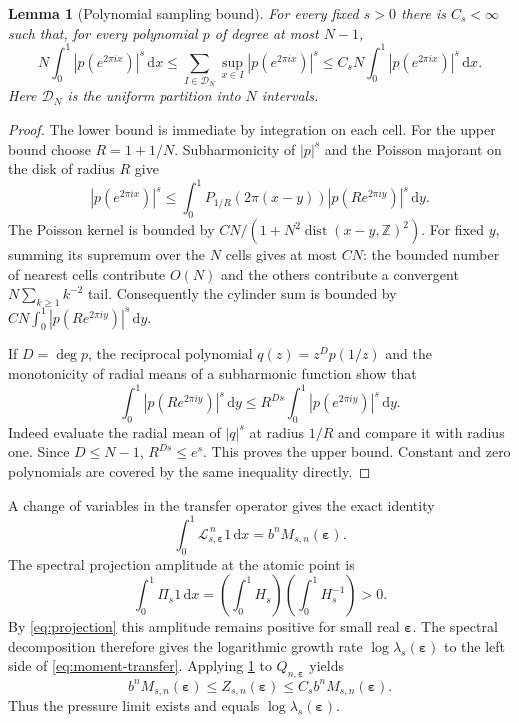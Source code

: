 \documentclass[11pt,a4paper]{article}
\numberwithin{equation}{section}
\newtheorem{lemma}[lemma]{Lemma}
\theoremstyle{definition}
\theoremstyle{remark}
\newcommand{\dd}{\,\mathrm d}
\newcommand{\Lop}{\mathcal L}
\newcommand{\dist}{\operatorname{dist}}
\newcommand{\eps}{\boldsymbol\varepsilon}
\newcommand{\Proj}{\Pi}
\begin{document}
\begin{lemma}[Polynomial sampling bound]
\label{lem:sampling}
For every fixed $s>0$ there is $C_s<\infty$ such that, for every
polynomial $p$ of degree at most $N-1$,
\begin{equation}
 N\int_0^1|p(e^{2\pi i x})|^s\dd x
 \leq\sum_{I\in\mathcal D_N}\sup_{x\in I}|p(e^{2\pi i x})|^s
 \leq C_s N\int_0^1|p(e^{2\pi i x})|^s\dd x.
 \label{eq:sampling}
\end{equation}
Here $\mathcal D_N$ is the uniform partition into $N$ intervals.
\end{lemma}
\begin{proof}
The lower bound is immediate by integration on each cell. For the
upper bound choose $R=1+1/N$. Subharmonicity of $|p|^s$ and the Poisson
majorant on the disk of radius $R$ give
\[
 |p(e^{2\pi i x})|^s\leq
 \int_0^1P_{1/R}(2\pi(x-y))|p(Re^{2\pi i y})|^s\dd y.
\]
The Poisson kernel is bounded by
$C N/(1+N^2\dist(x-y,\mathbb Z)^2)$. For fixed $y$, summing its
supremum over the $N$ cells gives at most $CN$: the bounded number
of nearest cells contribute $O(N)$ and the others contribute a
convergent $N\sum_{k\geq1}k^{-2}$ tail. Consequently the cylinder sum
is bounded by
$CN\int_0^1|p(Re^{2\pi i y})|^s\dd y$.

If $D=\deg p$, the reciprocal polynomial $q(z)=z^Dp(1/z)$ and the
monotonicity of radial means of a subharmonic function show that
\[
 \int_0^1|p(Re^{2\pi i y})|^s\dd y
 \leq R^{Ds}\int_0^1|p(e^{2\pi i y})|^s\dd y.
\]
Indeed evaluate the radial mean of $|q|^s$ at radius $1/R$ and compare
it with radius one. Since $D\leq N-1$, $R^{Ds}\leq e^s$.
This proves the upper bound. Constant and zero polynomials are covered
by the same inequality directly.
\end{proof}

A change of variables in the transfer operator gives the exact identity
\begin{equation}
 \int_0^1\Lop_{s,\eps}^{\,n}1\dd x=b^nM_{s,n}(\eps).
 \label{eq:moment-transfer}
\end{equation}
The spectral projection amplitude at the atomic point is
\begin{equation}
 \int_0^1\Proj_s1\dd x
 =\left(\int_0^1H_s\right)\left(\int_0^1H_s^{-1}\right)>0.
 \label{eq:amp-positive}
\end{equation}
By \cref{eq:projection} this amplitude remains positive for small real
$\eps$. The spectral decomposition therefore gives the logarithmic
growth rate $\log\lambda_s(\eps)$ to the left side of
\cref{eq:moment-transfer}. Applying \cref{lem:sampling} to
$Q_{n,\eps}$ yields
\begin{equation}
 b^nM_{s,n}(\eps)\leq Z_{s,n}(\eps)
                     \leq C_s b^nM_{s,n}(\eps).
 \label{eq:pressure-comparison}
\end{equation}
Thus the pressure limit exists and equals $\log\lambda_s(\eps)$.
\end{document}
